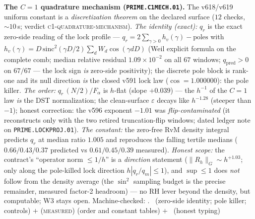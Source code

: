 \documentclass[11pt,a4paper]{article}
\theoremstyle{definition}
\begin{document}
\par\smallskip\noindent\textbf{The $C=1$ quadrature mechanism
(\texttt{PRIME.C1MECH.01}).}
The v618/v619 uniform constant is a \emph{discretization theorem} on
the declared surface ($12$ checks, ${\sim}10$\,s; verdict
\textsc{c1-quadrature-mechanism}).  \emph{The identity (exact):}
$q_r$ is the exact zero-side reading of the lock profile ---
$q_r=2\sum_{\gamma>0}h_v(\gamma)-\text{poles}$ with
$h_v(\gamma)=D\,\mathrm{sinc}^2(\gamma D/2)\sum_d W_d\cos(\gamma dD)$
(Weil explicit formula on the complete comb; median relative
residual $1.09\times10^{-2}$ on all $67$ windows; $q_{\mathrm{pred}}
>0$ on $67/67$ --- the lock sign \emph{is} zero-side positivity);
the discrete pole block is rank-one and its null direction \emph{is}
the closed v591 lock law ($\cos=1.000000$): the pole killer.
\emph{The order:} $q_r\,(N/2)/F_\alpha$ is $h$-flat (slope $+0.039$)
--- the $h^{-1}$ of the $C=1$ law \emph{is} the DST normalization;
the clean-surface $\varepsilon$ decays like $h^{-1.28}$ (steeper
than $-1$); honest correction: the v596 exponent $-1.01$ was
\emph{flip-contaminated} (it reconstructs only with the two retired
truncation-flip windows; dated ledger note on
\texttt{PRIME.LOCKPROJ.01}).  \emph{The constant:} the zero-free RvM
density integral predicts $q_r$ at median ratio $1.005$ and
reproduces the falling tertile medians ($0.66/0.43/0.37$ predicted
vs $0.61/0.45/0.39$ measured).  \emph{Honest scope:} the contract's
``operator norm $\le1/h$'' is a \emph{direction} statement
($\|R_h\|_G\sim h^{+1.03}$; only along the pole-killed lock
direction $h|q_r/q_m|\le1$), and $\sup\le1$ does \emph{not} follow
from the density average (the $\sin^2$ sampling budget is the
precise remainder, measured factor-2 headroom) --- no RH lever
beyond the density, but computable; W3 stays open.
Machine-checked: .
\mE\ (zero-side identity; pole killer; controls) $+$
(\textsc{measured}) (order and constant tables) $+$ \mC\ (honest
typing)
\par\smallskip
\end{document}
